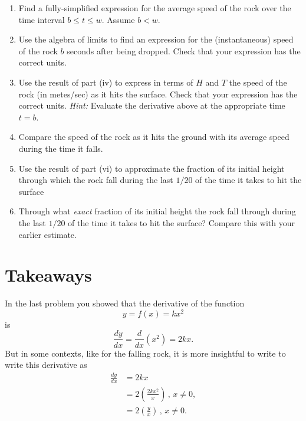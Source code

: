 \documentclass{ximera}
\begin{document}
\begin{question}
\begin{enumerate}
\begin{enumerate}
\item Find a fully-simplified expression for the average speed of the rock over the time interval $b\leq t \leq w$. Assume $b<w$.

\item Use the algebra of limits to find an expression for the (instantaneous) speed of the rock $b$ seconds after being dropped. Check that your expression has the correct units.

\item Use the result of part (iv) to express in terms of $H$ and $T$ the speed of the rock (in metes/sec) as it hits the surface. Check that your expression has the correct units. \emph{Hint:} Evaluate the derivative above at the appropriate time $t=b$.

\item Compare the speed of the rock as it hits the ground with its average speed during the time it falls.

\item Use the result of part (vi) to approximate the fraction of its initial height through which the rock fall during the last $1/20$ of the time it takes to hit the surface

\item Through what \emph{exact} fraction of its initial height the rock fall through during the last $1/20$ of the time it takes to hit the surface? Compare this with your earlier estimate.

\end{enumerate}

\end{enumerate}


\end{question}


\section{Takeaways}

In the last problem you showed that the derivative of the function
\[
     y = f(x) = kx^2
\]
is
\[
  \frac{dy}{dx} = \frac{d}{dx}\left(x^2 \right) = 2kx.
\]
But in some contexts, like for the falling rock, it is more insightful to write to write this derivative as
\begin{align*}
     \frac{dy}{dx} &= 2kx  \\
                          &= 2 \left( \frac{2kx^2}{x} \right) \, , \, x\neq 0, \\
                          &= 2 \left( \frac{y}{x} \right) \, , \, x\neq 0 .
\end{align*}
\end{document}
